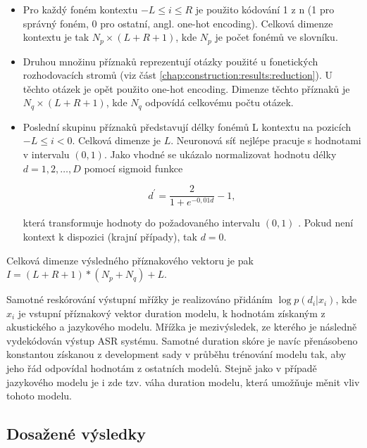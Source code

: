 \begin{itemize}
  \item Pro každý foném kontextu $-L \leq i \leq R$ je použito kódování 1 z n (1 pro správný foném, 0 pro ostatní, angl. one-hot encoding). Celková dimenze kontextu je tak $N_{p} \times \left(L + R + 1\right)$, kde $N_{p}$ je počet fonémů ve slovníku.
  \item Druhou množinu příznaků reprezentují otázky použité u fonetických rozhodovacích stromů (viz část \ref{chap:construction:results:reduction}). U těchto otázek je opět použito one-hot encoding. Dimenze těchto příznaků je $N_{q} \times \left(L + R + 1\right)$, kde $N_{q}$ odpovídá celkovému počtu otázek.
  \item Poslední skupinu příznaků představují délky fonémů L kontextu na pozicích $-L \leq i < 0$. Celková dimenze je $L$. Neuronová síť nejlépe pracuje s hodnotami v intervalu $\left(0, 1\right)$. Jako vhodné se ukázalo normalizovat hodnotu délky $d=1, 2, \dots, D$ pomocí sigmoid funkce

  \begin{equation}
    d^{\prime} = \frac{2}{1 + e^{-0,01d}} - 1,
    \label{eq:realisation:durationmodels:nn:normalization}
  \end{equation}

  \noindent která transformuje hodnoty do požadovaného intervalu $\left(0, 1\right)$ \cite{Alumae2014}. Pokud není kontext k dispozici (krajní případy), tak $d = 0$.
\end{itemize}

\noindent Celková dimenze výsledného příznakového vektoru je pak $I = \left(L + R + 1\right) \ast \left(N_{p} + N_{q}\right) + L$.

Samotné reskórování výstupní mřížky je realizováno přidáním $\log p\left(d_{i}| x_{i}\right)$, kde $x_{i}$ je vstupní příznakový vektor duration modelu, k hodnotám získaným z akustického a jazykového modelu. Mřížka je mezivýsledek, ze kterého je následně vydekódován výstup ASR systému. Samotné duration skóre je navíc přenásobeno konstantou získanou z development sady v průběhu trénování modelu tak, aby jeho řád odpovídal hodnotám z ostatních modelů. \cite{Hadian2017} Stejně jako v případě jazykového modelu je i zde tzv. váha duration modelu, která umožňuje měnit vliv tohoto modelu.

\subsection{Dosažené výsledky}
\label{chap:realisation:durationmodels:nn:softmax:results}

